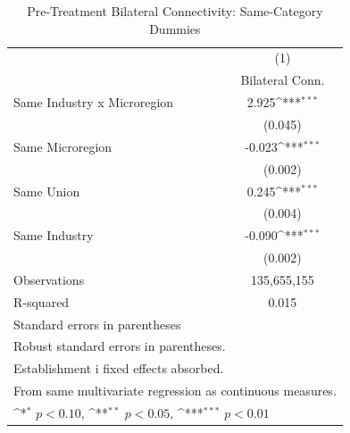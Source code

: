 \begin{table}[htbp]\centering
\def\sym#1{\ifmmode^{#1}\else\(^{#1}\)\fi}
\caption{Pre-Treatment Bilateral Connectivity: Same-Category Dummies}
\begin{tabular}{l*{1}{c}}
\toprule
                    &\multicolumn{1}{c}{(1)}\\
                    &\multicolumn{1}{c}{Bilateral Conn.}\\
\midrule
Same Industry x Microregion&       2.925\sym{***}\\
                    &     (0.045)         \\
\addlinespace
Same Microregion    &      -0.023\sym{***}\\
                    &     (0.002)         \\
\addlinespace
Same Union          &       0.245\sym{***}\\
                    &     (0.004)         \\
\addlinespace
Same Industry       &      -0.090\sym{***}\\
                    &     (0.002)         \\
\midrule
Observations        & 135,655,155         \\
R-squared           &       0.015         \\
\bottomrule
\multicolumn{2}{l}{\footnotesize Standard errors in parentheses}\\
\multicolumn{2}{l}{\footnotesize Robust standard errors in parentheses.}\\
\multicolumn{2}{l}{\footnotesize Establishment i fixed effects absorbed.}\\
\multicolumn{2}{l}{\footnotesize From same multivariate regression as continuous measures.}\\
\multicolumn{2}{l}{\footnotesize \sym{*} \(p<0.10\), \sym{**} \(p<0.05\), \sym{***} \(p<0.01\)}\\
\end{tabular}
\end{table}
